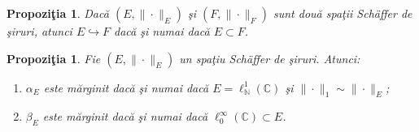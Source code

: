 \documentclass[ a4paper, 12pt]{report}
\newcommand{\C}{\mathbb{C}}
\newcommand{\N}{\mathbb{N}}
\newtheorem{prop}[theorem]{\bf Propozi\c tia }
\theoremstyle{definition}
\theoremstyle{remark}
\numberwithin{equation}{section}
\begin{document}
\begin{prop}
\label{prop2:continuousinjectionisalginclusion}
Dac\u a $(E,\|\cdot\|_{E})$ \c si $(F,\|\cdot\|_{F})$ sunt dou\u a spa\c tii Sch\"{a}ffer de \c siruri, atunci
$E\hookrightarrow F$ dac\u a \c si numai dac\u a $E\subset F$.
\end{prop}

\begin{prop}
\label{prop3:charactofboundforalphabeta}
Fie $(E,\|\cdot\|_{E})$ un spa\c tiu Sch\"{a}ffer de \c siruri. Atunci:
\begin{enumerate}
\item[(i)] $\alpha_{E}$ este m\u arginit dac\u a \c si numai dac\u a $E=\ell^1_{\N}(\C)$ \c si $\|\cdot\|_1 \sim \|\cdot\|_{E}$;
\item[(ii)] $\beta_{E}$ este m\u arginit dac\u a \c si numai dac\u a $\ell_0^{\infty}(\C)\subset E$.
\end{enumerate}
\end{prop}
\end{document}
